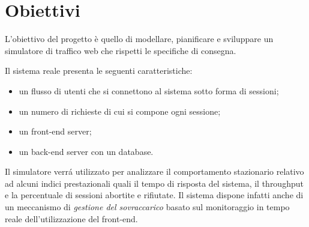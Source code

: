 \chapter{Obiettivi}
 	\label{cap:obiettivi}
 L'obiettivo del progetto è quello di modellare, pianificare e sviluppare un simulatore di traffico web che rispetti le specifiche di consegna.
 
\vspace{0.5 cm} \noindent Il sistema reale presenta le seguenti caratteristiche:
 \begin{itemize}
 \item un flusso di utenti che si connettono al sistema sotto forma di sessioni;
 \item un numero di richieste di cui si compone ogni sessione;
 \item un front-end server;
 \item un back-end server con un database.
 \end{itemize}

 Il simulatore verr\'a utilizzato per analizzare il comportamento stazionario relativo ad alcuni indici prestazionali quali il tempo di risposta del sistema, il throughput e la percentuale di sessioni abortite e rifiutate.
 Il sistema dispone infatti anche di un meccanismo di \emph{gestione del sovraccarico} basato sul monitoraggio in tempo reale dell'utilizzazione del front-end.\\

